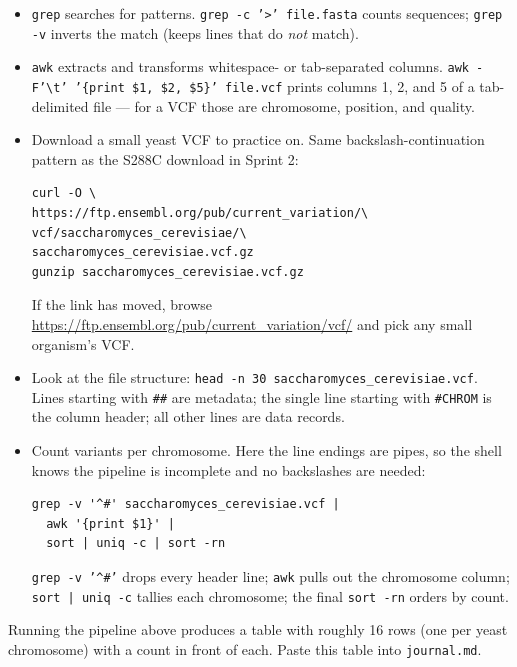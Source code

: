 \begin{itemize}[nosep]
  \item \texttt{grep} searches for patterns. \texttt{grep -c '>' file.fasta} counts sequences; \texttt{grep -v} inverts the match (keeps lines that do \textit{not} match).
  \item \texttt{awk} extracts and transforms whitespace- or tab-separated columns. \texttt{awk -F'\textbackslash t' '\{print \$1, \$2, \$5\}' file.vcf} prints columns 1, 2, and 5 of a tab-delimited file --- for a VCF those are chromosome, position, and quality.
  \item Download a small yeast VCF to practice on. Same backslash-continuation pattern as the S288C download in Sprint 2:
    \begin{lstlisting}
curl -O \
https://ftp.ensembl.org/pub/current_variation/\
vcf/saccharomyces_cerevisiae/\
saccharomyces_cerevisiae.vcf.gz
gunzip saccharomyces_cerevisiae.vcf.gz
    \end{lstlisting}
    If the link has moved, browse \url{https://ftp.ensembl.org/pub/current_variation/vcf/} and pick any small organism's VCF.
  \item Look at the file structure: \texttt{head -n 30 saccharomyces\_cerevisiae.vcf}. Lines starting with \texttt{\#\#} are metadata; the single line starting with \texttt{\#CHROM} is the column header; all other lines are data records.
  \item Count variants per chromosome. Here the line endings are pipes, so the shell knows the pipeline is incomplete and no backslashes are needed:
    \begin{lstlisting}
grep -v '^#' saccharomyces_cerevisiae.vcf |
  awk '{print $1}' |
  sort | uniq -c | sort -rn
    \end{lstlisting}
    \texttt{grep -v '\textasciicircum\#'} drops every header line; \texttt{awk} pulls out the chromosome column; \texttt{sort | uniq -c} tallies each chromosome; the final \texttt{sort -rn} orders by count.
\end{itemize}
\begin{winbox}[Checkpoint]
Running the pipeline above produces a table with roughly 16 rows (one per yeast chromosome) with a count in front of each. Paste this table into \texttt{journal.md}.
\end{winbox}

